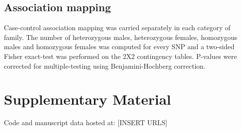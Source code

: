 \documentclass[11pt,a4paper]{report}
\begin{document}
\subsection*{Association mapping}
Case-control association mapping was carried separately in each category of family. The number of heterozygous males, heterozygous females, homozygous males and homozygous females was computed for every SNP and a two-sided Fisher exact-test was performed on the 2X2 contingency tables. P-values were corrected for multiple-testing using Benjamini-Hochberg correction. 
\section*{Supplementary Material}

Code and manuscript data hosted at: [INSERT URLS]


\fancyhead[L]{\slshape }

\end{document}
